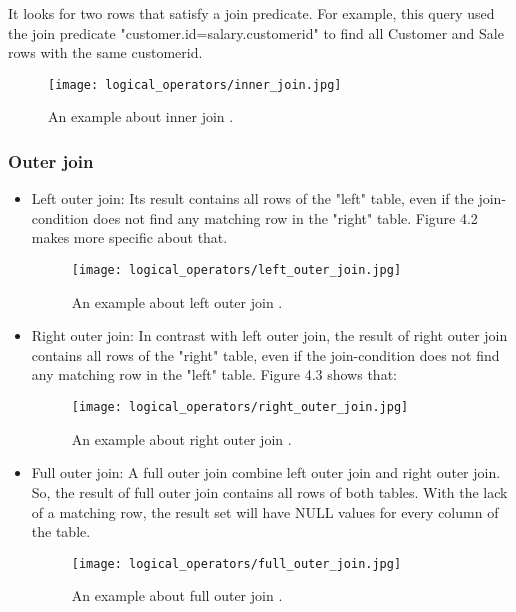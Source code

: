 It looks for two rows that satisfy a join predicate. For example, this query used the join predicate "customer.id=salary.customerid" to find all Customer and Sale rows with the same customerid.

\begin{figure}[H]
	\centering
	\texttt{[image: logical\_operators/inner\_join.jpg]}
	\caption{An example about inner join \cite{figures}.}
\end{figure}

\subsubsection{Outer join}

\begin{itemize}
	\item Left outer join: Its result contains all rows of the "left" table, even if the 				join-condition does not find any matching row in the "right" table. Figure 4.2
		makes more specific about that.
\begin{figure}[H]
	\centering
	\texttt{[image: logical\_operators/left\_outer\_join.jpg]}
	\caption{An example about left outer join \cite{figures}.}
\end{figure}

	\item Right outer join: In contrast with left outer join, the result of right outer join 		contains all rows of the "right" table, even if the join-condition does not find any 		matching row in the "left" table. Figure 4.3 shows that:

\begin{figure}[H]
	\centering
	\texttt{[image: logical\_operators/right\_outer\_join.jpg]}
	\caption{An example about right outer join \cite{figures}.}
\end{figure}

	\item Full outer join: A full outer join combine left outer join and right outer 					join. So, the result of full outer join contains all rows of both tables. With the 				lack of a matching row, the result set will have NULL values for every column of the 		table. 

\begin{figure}[H]
	\centering
	\texttt{[image: logical\_operators/full\_outer\_join.jpg]}
	\caption{An example about full outer join \cite{figures}.}
\end{figure}

\end{itemize}

